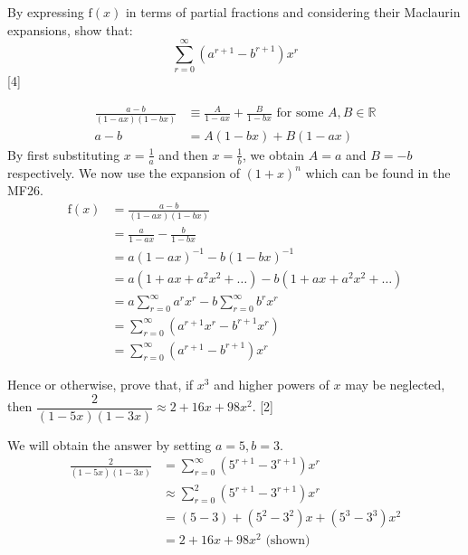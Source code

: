 \documentclass[12pt, a4 paper]{article}
\begin{document}
\begin{outline}[enumerate]
 \2 By expressing \(\textrm{f}(x)\) in terms of partial fractions and considering their Maclaurin expansions, show that:
 \begin{equation*}
  \sum_{r=0}^{\infty}(a^{r+1}-b^{r+1})x^{r}
 \end{equation*}\hfill[4]
 \begin{answer}
   \begin{align*}
     \frac{a-b}{(1-ax)(1-bx)} &\equiv \frac{A}{1-ax} + \frac{B}{1-bx} \textrm{ for some $A,B\in \mathbb{R}$}\\
     a-b &= A(1-bx) + B(1-ax)
   \end{align*}
 By first substituting $x=\frac{1}{a}$ and then $x=\frac{1}{b}$, we obtain $A=a$ and $B=-b$ respectively. We now use the expansion of $(1+x)^n$ which can be found in the MF26.
 \begin{align*}
   \textrm{f}(x)&=\frac{a-b}{(1-ax)(1-bx)}\\
   &= \frac{a}{1-ax} - \frac{b}{1-bx} \\
   &= a(1-ax)^{-1} - b(1-bx)^{-1} \\
   &= a(1+ax+a^2x^2+\dots) - b(1+ax+a^2x^2+\dots) \\
   &= a\sum_{r=0}^{\infty}a^rx^r - b\sum_{r=0}^{\infty}b^rx^r \\
   &= \sum_{r=0}^{\infty}(a^{r+1}x^r - b^{r+1}x^r) \\
   &= \sum_{r=0}^{\infty}(a^{r+1}-b^{r+1})x^r
 \end{align*}
 \end{answer}

 \2 Hence or otherwise, prove that, if \(x^3\) and higher powers of \(x\) may be neglected, then \(\dfrac{2}{(1-5x)(1-3x)} \approx 2+16x+98x^2\).
 \hfill[2]
 \begin{answer}
   We will obtain the answer by setting $a=5,b=3$.
   \begin{align*}
     \frac{2}{(1-5x)(1-3x)} &= \sum_{r=0}^{\infty}(5^{r+1}-3^{r+1})x^r \\
     &\approx \sum_{r=0}^{2}(5^{r+1}-3^{r+1})x^r \\
     &= (5-3) + (5^2 - 3^2)x + (5^3 - 3^3)x^2 \\
     &= 2 + 16x +98x^2 \textrm{ (shown)}
   \end{align*}
 \end{answer}


\end{outline}
\end{document}
